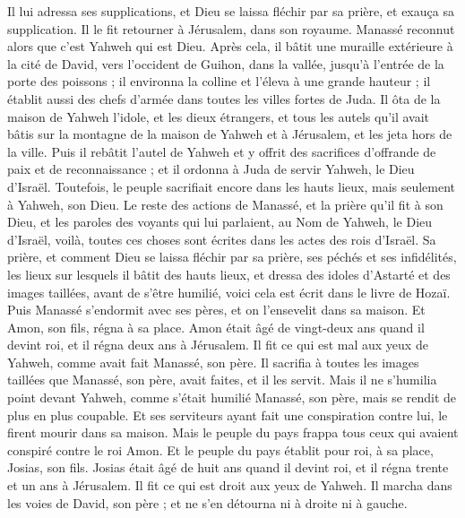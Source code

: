 \begin{multicols}{2}
Il lui adressa ses supplications, et Dieu se laissa fléchir par sa prière, et exauça sa supplication. Il le fit retourner à Jérusalem, dans son royaume. Manassé reconnut alors que c'est Yahweh qui est Dieu.
Après cela, il bâtit une muraille extérieure à la cité de David, vers  l'occident de Guihon, dans la vallée, jusqu'à l'entrée de la porte des poissons ; il environna la colline et l’éleva à une grande hauteur ; il établit aussi des chefs d'armée dans toutes les villes fortes de Juda.
Il ôta de la maison de Yahweh l'idole, et les dieux étrangers, et tous les autels qu'il avait bâtis sur la montagne de la maison de Yahweh et à Jérusalem, et les jeta hors de la ville.
Puis il rebâtit l'autel de Yahweh et y offrit des sacrifices d'offrande de paix et de reconnaissance ; et il ordonna à Juda de servir Yahweh, le Dieu d'Israël.
Toutefois, le peuple sacrifiait encore dans les hauts lieux, mais seulement à Yahweh, son Dieu.
Le reste des actions de Manassé, et la prière qu'il fit à son Dieu, et les paroles des voyants qui lui parlaient, au Nom de Yahweh, le Dieu d'Israël, voilà, toutes ces choses sont écrites dans les actes des rois d'Israël.
Sa prière, et comment Dieu se laissa fléchir par sa prière, ses péchés et ses infidélités, les lieux sur lesquels il bâtit des hauts lieux, et dressa des idoles d'Astarté et des images taillées, avant de s'être humilié, voici cela est écrit dans le livre de Hozaï.
Puis Manassé s'endormit avec ses pères, et on l'ensevelit dans sa maison. Et Amon, son fils, régna à sa place.
Amon était âgé de vingt-deux ans quand il devint roi, et il régna deux ans à Jérusalem.
Il fit ce qui est mal aux yeux de Yahweh, comme avait fait Manassé, son père. Il sacrifia à toutes les images taillées que Manassé, son père, avait faites, et il les servit.
Mais il ne s'humilia point devant Yahweh, comme s'était humilié Manassé, son père, mais se rendit de plus en plus coupable.
Et ses serviteurs ayant fait une conspiration contre lui, le firent mourir dans sa maison.
Mais le peuple du pays frappa tous ceux qui avaient conspiré contre le roi Amon. Et le peuple du pays établit pour roi, à sa place, Josias, son fils.
\VerseOne{}Josias était âgé de huit ans quand il devint roi, et il régna trente et un ans à Jérusalem.
Il fit ce qui est droit aux yeux de Yahweh. Il marcha dans les voies de David, son père ; et ne s'en détourna ni à droite ni à gauche.

\end{multicols}

